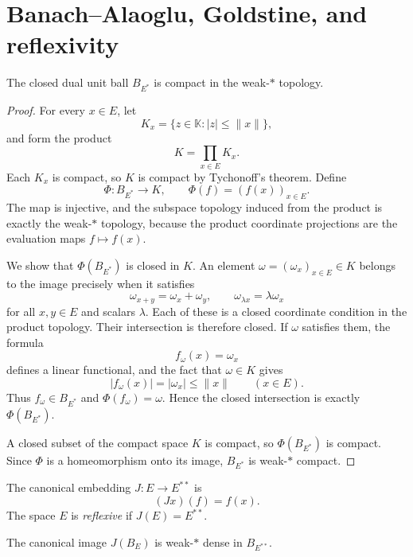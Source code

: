 \section{Banach--Alaoglu, Goldstine, and reflexivity}

\begin{notetheorem}
The closed dual unit ball $B_{E^*}$ is compact in the weak-$*$ topology.
\end{notetheorem}

\begin{proof}
For every $x\in E$, let
\[
  K_x=\{z\in\mathbb K:|z|\le\|x\|\},
\]
and form the product
\[
  K=\prod_{x\in E}K_x.
\]
Each $K_x$ is compact, so $K$ is compact by Tychonoff's theorem.  Define
\[
  \Phi\colon B_{E^*}\to K,
  \qquad
  \Phi(f)=(f(x))_{x\in E}.
\]
The map is injective, and the subspace topology induced from the product is
exactly the weak-$*$ topology, because the product coordinate projections
are the evaluation maps $f\mapsto f(x)$.

We show that $\Phi(B_{E^*})$ is closed in $K$.  An element
$\omega=(\omega_x)_{x\in E}\in K$ belongs to the image precisely when it
satisfies
\[
  \omega_{x+y}=\omega_x+\omega_y,
  \qquad
  \omega_{\lambda x}=\lambda\omega_x
\]
for all $x,y\in E$ and scalars $\lambda$.  Each of these is a closed
coordinate condition in the product topology.  Their intersection is
therefore closed.  If $\omega$ satisfies them, the formula
\[
  f_\omega(x)=\omega_x
\]
defines a linear functional, and the fact that $\omega\in K$ gives
\[
  |f_\omega(x)|=|\omega_x|\le\|x\|
  \qquad(x\in E).
\]
Thus $f_\omega\in B_{E^*}$ and $\Phi(f_\omega)=\omega$.  Hence the closed
intersection is exactly $\Phi(B_{E^*})$.

A closed subset of the compact space $K$ is compact, so
$\Phi(B_{E^*})$ is compact.  Since $\Phi$ is a homeomorphism onto its image,
$B_{E^*}$ is weak-$*$ compact.
\end{proof}

\begin{notedefinition}
The canonical embedding $J\colon E\to E^{**}$ is
\[
  (Jx)(f)=f(x).
\]
The space $E$ is \emph{reflexive} if $J(E)=E^{**}$.
\end{notedefinition}

\begin{notetheorem}
The canonical image $J(B_E)$ is weak-$*$ dense in $B_{E^{**}}$.
\end{notetheorem}

